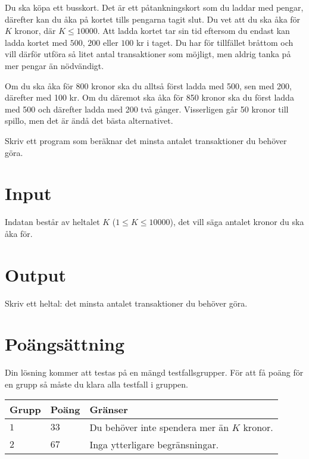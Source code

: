 Du ska köpa ett busskort. Det är ett påtankningskort som du laddar med pengar, därefter kan du åka på kortet tills pengarna tagit slut. Du vet att du ska åka för $K$ kronor, där $K \leq 10000$. Att ladda kortet tar sin tid eftersom du endast kan ladda kortet med $500$, $200$ eller $100$ kr i taget. Du har för tillfället bråttom och vill därför utföra så litet antal transaktioner som möjligt, men aldrig tanka på mer pengar än nödvändigt.

Om du ska åka för 800 kronor ska du alltså först ladda med 500, sen med 200, därefter med 100 kr. Om du däremot ska åka för 850 kronor ska du först ladda med 500 och därefter ladda med 200 två gånger. Visserligen går 50 kronor till spillo, men det är ändå det bästa alternativet.

Skriv ett program som beräknar det minsta antalet transaktioner du behöver göra.

\section*{Input}
Indatan består av heltalet $K$ ($1 \leq K \leq 10000$), det vill säga antalet kronor du ska åka för.

\section*{Output}
Skriv ett heltal: det minsta antalet transaktioner du behöver göra.


\section*{Poängsättning}
Din lösning kommer att testas på en mängd testfallsgrupper.
För att få poäng för en grupp så måste du klara alla testfall i gruppen.

\noindent
\begin{tabular}{| l | l | p{12cm} |}
  \hline
  \textbf{Grupp} & \textbf{Poäng} & \textbf{Gränser} \\ \hline
  $1$    & $33$        & Du behöver inte spendera mer än $K$ kronor. \\ \hline 
  $2$    & $67$        & Inga ytterligare begränsningar. \\ \hline
\end{tabular}
